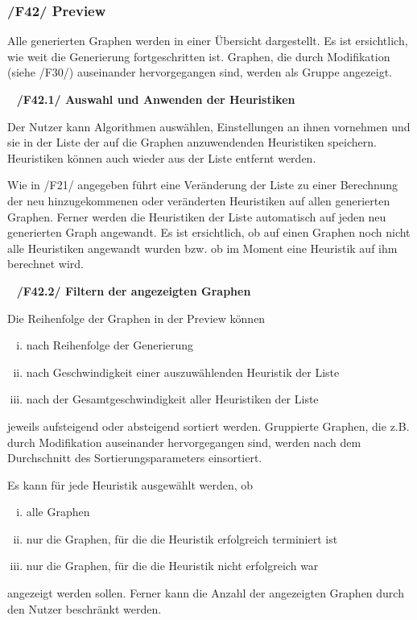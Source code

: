 \documentclass{article}
\begin{document}
	\subsubsection*{/F42/ Preview} \label{f42} 
	Alle generierten Graphen werden in einer Übersicht dargestellt. Es ist ersichtlich, wie weit die Generierung fortgeschritten ist. Graphen, die durch Modifikation (siehe /F30/) auseinander hervorgegangen sind, werden als Gruppe angezeigt.
	
	~\newline
	\textbf{/F42.1/ Auswahl und Anwenden der Heuristiken}
	
	Der Nutzer kann Algorithmen auswählen, Einstellungen an ihnen vornehmen und sie in der Liste der auf die Graphen anzuwendenden Heuristiken speichern. Heuristiken können auch wieder aus der Liste entfernt werden. 
	
	Wie in /F21/ angegeben führt eine Veränderung der Liste zu einer Berechnung der neu hinzugekommenen oder veränderten Heuristiken auf allen generierten Graphen. Ferner werden die Heuristiken der Liste automatisch auf jeden neu generierten Graph angewandt.
	Es ist ersichtlich, ob auf einen Graphen noch nicht alle Heuristiken angewandt wurden bzw. ob im Moment eine Heuristik auf ihm berechnet wird.
	
	~\newline
	\textbf{/F42.2/ Filtern der angezeigten Graphen}
	
	Die Reihenfolge der Graphen in der Preview können
	\begin{enumerate}[i)]
		\item{nach Reihenfolge der Generierung}
		\item{nach Geschwindigkeit einer auszuwählenden Heuristik der Liste}
		\item{nach der Gesamtgeschwindigkeit aller Heuristiken der Liste}
	\end{enumerate}
	jeweils aufsteigend oder absteigend sortiert werden.
	Gruppierte Graphen, die z.B. durch Modifikation auseinander hervorgegangen sind, werden nach dem Durchschnitt des Sortierungsparameters einsortiert.
	
	Es kann für jede Heuristik ausgewählt werden, ob
	\begin{enumerate}[i)]
		\item{alle Graphen}
		\item{nur die Graphen, für die die Heuristik erfolgreich terminiert ist}
		\item{nur die Graphen, für die die Heuristik nicht erfolgreich war}
	\end{enumerate}
	angezeigt werden sollen. Ferner kann die Anzahl der angezeigten Graphen durch den Nutzer beschränkt werden.
	
\end{document}
